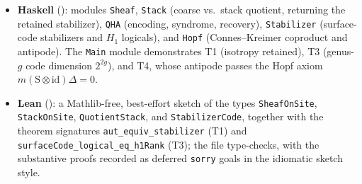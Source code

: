 \documentclass[12pt]{article}
\theoremstyle{definition}
\theoremstyle{remark}
\newcommand{\id}{\mathrm{id}}
\newcommand{\antipode}{\mathrm{S}}
\newcommand{\cop}{\Delta}
\begin{document}
\begin{itemize}
\item \textbf{Haskell} (): modules
\texttt{Sheaf}, \texttt{Stack} (coarse vs.\ stack quotient, returning the retained
stabilizer), \texttt{QHA} (encoding, syndrome, recovery), \texttt{Stabilizer}
(surface-code stabilizers and $H_1$ logicals), and \texttt{Hopf} (Connes--Kreimer
coproduct and antipode). The \texttt{Main} module demonstrates T1 (isotropy retained),
T3 (genus-$g$ code dimension $2^{2g}$), and T4, whose antipode passes the Hopf axiom
$m(\antipode\otimes\id)\cop=0$.

\item \textbf{Lean} (): a Mathlib-free,
best-effort sketch of the types \texttt{SheafOnSite}, \texttt{StackOnSite},
\texttt{QuotientStack}, and \texttt{StabilizerCode}, together with the theorem signatures
\texttt{aut\_equiv\_stabilizer} (T1) and \texttt{surfaceCode\_logical\_eq\_h1Rank} (T3);
the file type-checks, with the substantive proofs recorded as deferred \texttt{sorry}
goals in the idiomatic sketch style.
\end{itemize}
\end{document}
